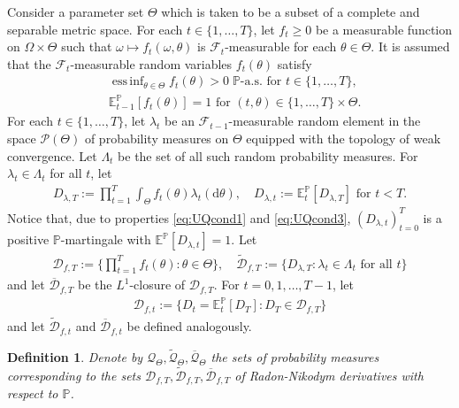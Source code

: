 \documentclass[11pt,a4paper]{article}
\newtheorem{definition}{Definition}
\newcommand{\E}{\mathbb{E}}
\DeclareMathOperator*{\essinf}{ess\,inf}
\renewcommand{\P}{\mathbb{P}}
\newcommand{\calF}{\mathcal{F}}
\newcommand{\calP}{\mathcal{P}}
\newcommand{\calQ}{\mathcal{Q}}
\newcommand{\calD}{\mathcal{D}}
\begin{document}
Consider a parameter set $\Theta$ which is taken to be a subset of a complete and separable metric space. 
For each $t\in\{1,\dots,T\}$, let $f_t\geq 0$ be a measurable function on $\Omega \times \Theta$ such that $\omega \mapsto f_t(\omega,\theta)$ is $\calF_t$-measurable for each $\theta\in\Theta$. 
It is assumed that the $\calF_t$-measurable random variables $f_t(\theta)$ satisfy 
\begin{align}
& \essinf_{\theta\in\Theta}f_t(\theta)>0 \; \P\text{-a.s.~for } t \in\{1,\dots,T\}, \label{eq:UQcond1} \\
& \E^{\P}_{t-1}[f_t(\theta)]=1 \text{ for } (t,\theta) \in\{1,\dots,T\} \times \Theta. \label{eq:UQcond3}
\end{align}
For each $t\in\{1,\dots,T\}$, let $\lambda_t$ be an $\calF_{t-1}$-measurable random element in the space $\calP(\Theta)$ of probability measures on $\Theta$ equipped with the topology of weak convergence. Let $\Lambda_t$ be the set of all such random probability measures. 
For $\lambda_t\in\Lambda_t$ for all $t$, let 
\begin{align}\label{eq:D_lambda}
D_{\lambda,T}:=\prod_{t=1}^T \int_\Theta f_t(\theta) \lambda_t(\mathrm{d}\theta), 
\quad D_{\lambda,t}:=\E^{\P}_t[D_{\lambda,T}] \text{ for } t<T. 
\end{align}
Notice that, due to properties \eqref{eq:UQcond1} and \eqref{eq:UQcond3}, $(D_{\lambda,t})_{t=0}^T$ is a positive $\P$-martingale with $\E^{\P}[D_{\lambda,t}]=1$. 
Let 
\begin{align*}
\calD_{f,T} := \bigg\{\prod_{t=1}^T f_t(\theta):\theta\in\Theta\bigg\}, \quad 
\widetilde{\calD}_{f,T} := \Big\{D_{\lambda,T}:\lambda_t\in \Lambda_t \text{ for all } t\Big\} 
\end{align*}
and let $\overline{\calD}_{f,T}$ be the $L^1$-closure of $\calD_{f,T}$. For $t=0,1,\dots,T-1$, let 
\begin{align*}
\calD_{f,t} := \Big\{D_t=\E^{\P}_t[D_T]:D_T\in \calD_{f,T}\Big\}  
\end{align*}
and let $\widetilde{\calD}_{f,t}$ and $\overline{\calD}_{f,t}$ be defined analogously. 

\begin{definition}\label{def:curlyQs}
Denote by $\calQ_{\Theta},\widetilde{\calQ}_{\Theta},\overline{\calQ}_{\Theta}$ the sets of probability measures corresponding to the sets $\calD_{f,T},\widetilde{\calD}_{f,T},\overline{\calD}_{f,T}$ of Radon-Nikodym derivatives with respect to $\P$. 
\end{definition}
\end{document}
